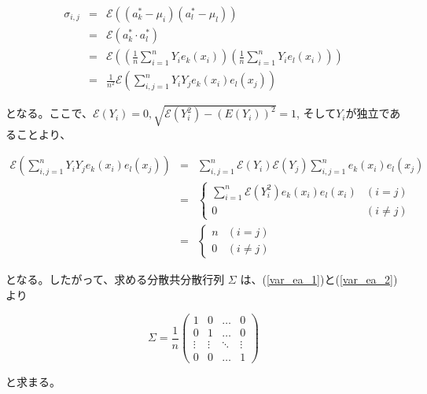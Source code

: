 \documentclass[a4paper,xelatex,ja=standard,jafont=hiragino-pron, 10pt]{bxjsarticle}
\begin{document}
\begin{eqnarray}
  \sigma_{i, j}
    &=& \mathscr{E}
      \left(
        \left(a^*_k - \mu_i\right)
        \left(a^*_l - \mu_l\right)
      \right) \nonumber \\
    &=& \mathscr{E}\left(a^*_k \cdot a^*_l \right) \nonumber \\
    &=& \mathscr{E}
      \left(
        \left(\frac{1}{n} \sum_{i = 1}^n Y_i e_k (x_i)\right)
        \left(\frac{1}{n} \sum_{i = 1}^n Y_i e_l (x_i)\right)
      \right) \nonumber \\
    &=& \frac{1}{n^2} \mathscr{E}
      \left(
        \sum_{i, j = 1}^n Y_i Y_j e_k(x_i) e_l(x_j)
      \right) \label{var_ea_1}
\end{eqnarray}

となる。ここで、$\mathscr{E}(Y_i) = 0, \sqrt{\mathscr{E}(Y_i^2) - (E(Y_i))^2} = 1$, そして$Y_i$が独立であることより、

\begin{eqnarray}
  \mathscr{E}\left(
    \sum_{i, j = 1}^n Y_i Y_j e_k(x_i) e_l(x_j)
  \right)
    &=& \sum_{i, j = 1}^n \mathscr{E}(Y_i)\mathscr{E}(Y_j) \sum_{i, j = 1}^n e_k(x_i) e_l(x_j) \nonumber \\
    &=& \begin{cases}
      \sum_{i = 1}^n \mathscr{E}\left(Y_i^2\right)e_k(x_i) e_l(x_i) & (i = j) \\
      0  & (i \neq j)
    \end{cases} \nonumber \\
    &=& \begin{cases}
      n & (i = j) \\
      0 & (i \neq j)
    \end{cases} \label{var_ea_2}
\end{eqnarray}

となる。したがって、求める分散共分散行列 $\Sigma$ は、(\ref{var_ea_1})と(\ref{var_ea_2})より

\begin{equation}
  \Sigma = \frac{1}{n}\left(
    \begin{array}{cccc}
      1 & 0 & \ldots & 0 \\
      0 & 1 & \ldots & 0 \\
      \vdots & \vdots & \ddots & \vdots \\
      0 & 0 & \ldots & 1
    \end{array}
  \right)
\end{equation}

と求まる。
\end{document}

